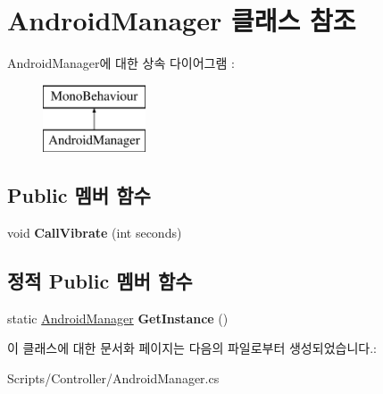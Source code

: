 \hypertarget{class_android_manager}{}\section{Android\+Manager 클래스 참조}
\label{class_android_manager}
Android\+Manager에 대한 상속 다이어그램 \+: \begin{figure}[H]
\begin{center}
\leavevmode
\includegraphics[height=2.000000cm]{class_android_manager}
\end{center}
\end{figure}
\subsection*{Public 멤버 함수}
\begin{DoxyCompactItemize}
\item 
\hypertarget{class_android_manager_a065b2fd453c42d8ffda3c18d92d47df6}{}void {\bfseries Call\+Vibrate} (int seconds)\label{class_android_manager_a065b2fd453c42d8ffda3c18d92d47df6}

\end{DoxyCompactItemize}
\subsection*{정적 Public 멤버 함수}
\begin{DoxyCompactItemize}
\item 
\hypertarget{class_android_manager_aedf12fa02a8fc5c00acf5d6aeed591ed}{}static \hyperlink{class_android_manager}{Android\+Manager} {\bfseries Get\+Instance} ()\label{class_android_manager_aedf12fa02a8fc5c00acf5d6aeed591ed}

\end{DoxyCompactItemize}


이 클래스에 대한 문서화 페이지는 다음의 파일로부터 생성되었습니다.\+:\begin{DoxyCompactItemize}
\item 
Scripts/\+Controller/Android\+Manager.\+cs\end{DoxyCompactItemize}
